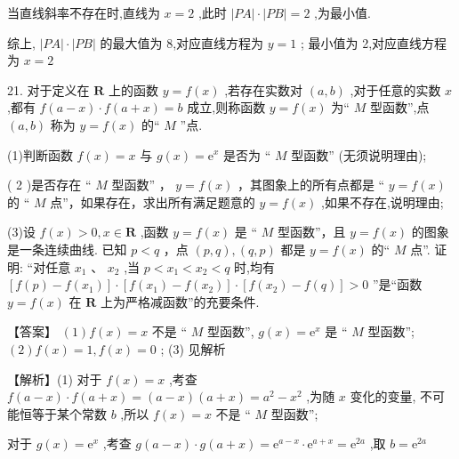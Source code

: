 \documentclass[10pt]{article}
\begin{document}
当直线斜率不存在时,直线为 \(x = 2\) ,此时 \(\left| {PA}\right|  \cdot  \left| {PB}\right|  = 2\) ,为最小值.

综上, \(\left| {PA}\right|  \cdot  \left| {PB}\right|\) 的最大值为 8,对应直线方程为 \(y = 1\) ; 最小值为 2,对应直线方程为 \(x = 2\)

21. 对于定义在 \(\mathbf{R}\) 上的函数 \(y = f\left( x\right)\) ,若存在实数对 \(\left( {a,b}\right)\) ,对于任意的实数 \(x\) ,都有 \(f\left( {a - x}\right)  \cdot  f\left( {a + x}\right)  = b\) 成立,则称函数 \(y = f\left( x\right)\) 为“ \(M\) 型函数”,点 \(\left( {a,b}\right)\) 称为 \(y = f\left( x\right)\) 的“ \(M\) ”点.

(1)判断函数 \(f\left( x\right)  = x\) 与 \(g\left( x\right)  = {\mathrm{e}}^{x}\) 是否为 “ \(M\) 型函数” (无须说明理由);

( 2 )是否存在 “ \(M\) 型函数” ， \(y = f\left( x\right)\) ，其图象上的所有点都是 “ \(y = f\left( x\right)\) 的 “ \(M\) 点”，如果存在，求出所有满足题意的 \(y = f\left( x\right)\) ,如果不存在,说明理由;

(3)设 \(f\left( x\right)  > 0,x \in  \mathbf{R}\) ,函数 \(y = f\left( x\right)\) 是 “ \(M\) 型函数”，且 \(y = f\left( x\right)\) 的图象是一条连续曲线. 已知 \(p < q\) ，点 \(\left( {p,q}\right) ,\left( {q,p}\right)\) 都是 \(y = f\left( x\right)\) 的“ \(M\) 点”. 证明: “对任意 \({x}_{1}\text{ 、 }{x}_{2}\) ,当 \(p < {x}_{1} < {x}_{2} < q\) 时,均有 \(\left\lbrack  {f\left( p\right)  - f\left( {x}_{1}\right) }\right\rbrack   \cdot  \left\lbrack  {f\left( {x}_{1}\right)  - f\left( {x}_{2}\right) }\right\rbrack   \cdot  \left\lbrack  {f\left( {x}_{2}\right)  - f\left( q\right) }\right\rbrack   > 0\) ”是“函数 \(y = f\left( x\right)\) 在 \(\mathbf{R}\) 上为严格减函数”的充要条件.

【答案】 \(\left( 1\right) f\left( x\right)  = x\) 不是 “ \(M\) 型函数”, \(g\left( x\right)  = {\mathrm{e}}^{x}\) 是 “ \(M\) 型函数”; \(\left( 2\right) f\left( x\right)  = 1,f\left( x\right)  = 0\) ; (3) 见解析

【解析】(1) 对于 \(f\left( x\right)  = x\) ,考查 \(f\left( {a - x}\right)  \cdot  f\left( {a + x}\right)  = \left( {a - x}\right) \left( {a + x}\right)  = {a}^{2} - {x}^{2}\) ,为随 \(x\) 变化的变量, 不可能恒等于某个常数 \(b\) ,所以 \(f\left( x\right)  = x\) 不是 “ \(M\) 型函数”;

对于 \(g\left( x\right)  = {\mathrm{e}}^{x}\) ,考查 \(g\left( {a - x}\right)  \cdot  g\left( {a + x}\right)  = {\mathrm{e}}^{a - x} \cdot  {\mathrm{e}}^{a + x} = {\mathrm{e}}^{2a}\) ,取 \(b = {\mathrm{e}}^{2a}\)
\end{document}
